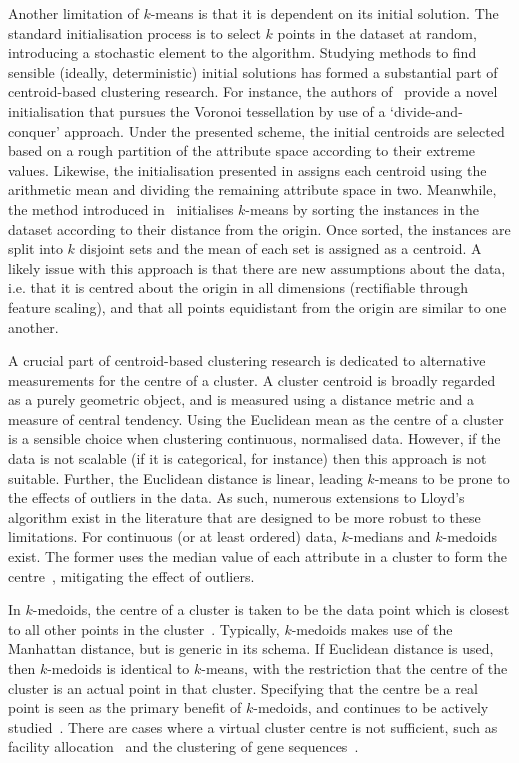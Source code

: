 Another limitation of \(k\)-means is that it is dependent on its initial
solution. The standard initialisation process is to select \(k\) points in the
dataset at random, introducing a stochastic element to the algorithm. Studying
methods to find sensible (ideally, deterministic) initial solutions has formed a
substantial part of centroid-based clustering research. For instance, the
authors of~\cite{Manoharan2016} provide a novel initialisation that pursues the
Voronoi tessellation by use of a `divide-and-conquer' approach. Under the
presented scheme, the initial centroids are selected based on a rough partition
of the attribute space according to their extreme values.  Likewise, the
initialisation presented in \cite{Singh2013} assigns each centroid using the
arithmetic mean and dividing the remaining attribute space in two.  Meanwhile,
the method introduced in~\cite{Katara2015} initialises \(k\)-means by sorting
the instances in the dataset according to their distance from the origin. Once
sorted, the instances are split into \(k\) disjoint sets and the mean of each
set is assigned as a centroid. A likely issue with this approach is that there
are new assumptions about the data, i.e. that it is centred about the origin in
all dimensions (rectifiable through feature scaling), and that all points
equidistant from the origin are similar to one another.

A crucial part of centroid-based clustering research is dedicated to alternative
measurements for the centre of a cluster. A cluster centroid is broadly regarded
as a purely geometric object, and is measured using a distance metric and a
measure of central tendency. Using the Euclidean mean as the centre of a cluster
is a sensible choice when clustering continuous, normalised data. However, if
the data is not scalable (if it is categorical, for instance) then this approach
is not suitable. Further, the Euclidean distance is linear, leading \(k\)-means
to be prone to the effects of outliers in the data. As such, numerous
extensions to Lloyd's algorithm exist in the literature that are designed to be
more robust to these limitations. For continuous (or at least ordered) data,
\(k\)-medians and \(k\)-medoids exist. The former uses the median value of each
attribute in a cluster to form the centre~\cite{Arya2001,Bradley1997},
mitigating the effect of outliers.

In \(k\)-medoids, the centre of a cluster is taken to be the data point
which is closest to all other points in the cluster~\cite{Kaufman1987}.
Typically, \(k\)-medoids makes use of the Manhattan distance, but is generic in
its schema. If Euclidean distance is used, then \(k\)-medoids is identical to
\(k\)-means, with the restriction that the centre of the cluster is an actual
point in that cluster. Specifying that the centre be a real point is seen as the
primary benefit of \(k\)-medoids, and continues to be actively
studied~\cite{Schubert2019,Ushakov2021}. There are cases where a virtual cluster
centre is not sufficient, such as facility allocation~\cite{Chen2016,Wang2020}
and the clustering of gene sequences~\cite{Johnson2018}.

